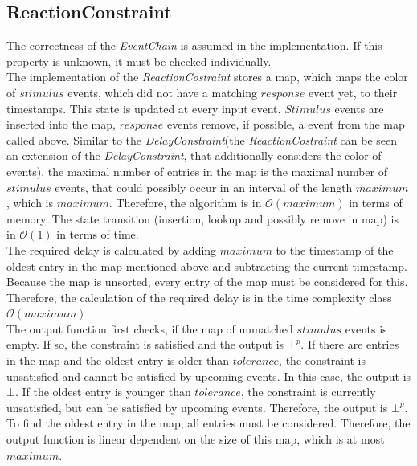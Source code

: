 \subsection{ReactionConstraint}
	The correctness of the \textit{EventChain} is assumed in the implementation. If this property is unknown, it must be checked individually.\\
	The implementation of the \emph{ReactionCostraint} stores a map, which maps the color of $stimulus$ events, which did not have a matching $response$ event yet, to their timestamps. This state is updated at every input event. $Stimulus$ events are inserted into the map, $response$ events remove, if possible, a event from the map called above. Similar to the \emph{DelayConstraint}(the \emph{ReactionCostraint} can be seen an extension of the \emph{DelayConstraint}, that additionally considers the color of events), the maximal number of entries in the map is the maximal number of $stimulus$ events, that could possibly occur in an interval of the length $maximum$, which is $maximum$.  Therefore, the algorithm is in $\mathcal{O}(maximum)$ in terms of memory. The state transition (insertion, lookup and possibly remove in map) is in $\mathcal{O}(1)$ in terms of time.\\
	The required delay is calculated by adding $maximum$ to the timestamp of the oldest entry in the map mentioned above and subtracting the current timestamp. Because the map is unsorted, every entry of the map must be considered for this. Therefore, the calculation of the required delay is in the time complexity class $\mathcal{O}(maximum)$.\\
	The output function first checks, if the map of unmatched $stimulus$ events is empty. If so, the constraint is satisfied and the output is $\top^p$. If there are entries in the map and the oldest entry is older than $tolerance$, the constraint is unsatisfied and cannot be satisfied by upcoming events. In this case, the output is $\bot$. If the oldest entry is younger than $tolerance$, the constraint is currently unsatisfied, but can be satisfied by upcoming events. Therefore, the output is $\bot^p$. To find the oldest entry in the map, all entries must be considered. Therefore, the output function is linear dependent on the size of this map, which is at most $maximum$.
	
